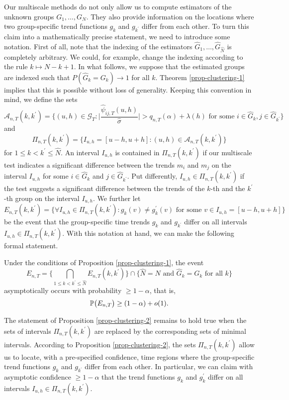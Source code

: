 \documentclass[a4paper,12pt]{article}
\numberwithin{equation}{section}
\begin{document}
Our multiscale methods do not only allow us to compute estimators of the unknown groups $G_1,\ldots,G_N$. They also provide information on the locations where two group-specific trend functions $g_k$ and $g_{k^\prime}$ differ from each other. To turn this claim into a mathematically precise statement, we need to introduce some notation. First of all, note that the indexing of the estimators $\widehat{G}_1,\ldots,\widehat{G}_{\widehat{N}}$ is completely arbitrary. We could, for example, change the indexing according to the rule $k \mapsto N - k + 1$. In what follows, we suppose that the estimated groups are indexed such that $P( \widehat{G}_k = G_k) \rightarrow 1$ for all $k$. Theorem \ref{prop-clustering-1} implies that this is possible without loss of generality. Keeping this convention in mind, we define the sets 
\[ \mathcal{A}_{n,T}(k,k^\prime) = \Big\{ (u,h) \in \mathcal{G}_T: \Big| \frac{\widehat{\psi}_{ij,T}(u,h)}{\widehat{\sigma}} \Big| > q_{n,T}(\alpha) + \lambda(h) \text{ for some } i \in \widehat{G}_k, j \in \widehat{G}_{k^\prime} \Big\} \] 
and  
\[ \Pi_{n,T}(k,k^\prime) = \big\{ I_{u,h} = [u-h,u+h]: (u,h) \in \mathcal{A}_{n,T}(k,k^\prime) \big\} \]
for $1 \le k < k^\prime \le \widehat{N}$. An interval $I_{u,h}$ is contained in $\Pi_{n,T}(k,k^\prime)$ if our multiscale test indicates a significant difference between the trends $m_i$ and $m_j$ on the interval $I_{u,h}$ for some $i \in \widehat{G}_k$ and $j \in \widehat{G}_{k^\prime}$. Put differently,  $I_{u,h} \in \Pi_{n,T}(k,k^\prime)$ if the test suggests a significant difference between the trends of the $k$-th and the $k^\prime$-th group on the interval $I_{u,h}$. We further let
\[ E_{n,T}(k,k^\prime) = \Big\{ \forall I_{u,h} \in \Pi_{n,T}(k,k^\prime): g_k(v) \ne g_k^\prime(v) \text{ for some } v \in I_{u,h} = [u-h,u+h] \Big\} \]
be the event that the group-specific time trends $g_k$ and $g_{k^\prime}$ differ on all intervals $I_{u,h} \in \Pi_{n,T}(k,k^\prime)$. With this notation at hand, we can make the following formal statement.
\begin{prop}\label{prop-clustering-2}
Under the conditions of Proposition \ref{prop-clustering-1}, the event 
\[ E_{n,T} = \Big\{ \bigcap_{1 \le k < k^\prime \le \widehat{N}} E_{n,T}(k,k^\prime) \Big\} \cap \Big\{ \widehat{N} = N \text{ and } \widehat{G}_k = G_k \text{ for all } k \Big\} \]
asymptotically occurs with probability $\ge 1-\alpha$, that is, 
\[ \mathbb{P} \big( E_{n,T} \big) \ge (1 - \alpha) + o(1). \]
\end{prop}
The statement of Proposition \ref{prop-clustering-2} remains to hold true when the sets of intervals $\Pi_{n,T}(k,k^\prime)$ are replaced by the corresponding sets of minimal intervals. According to Proposition \ref{prop-clustering-2}, the sets $\Pi_{n,T}(k,k^\prime)$ allow us to locate, with a pre-specified confidence, time regions where the group-specific trend functions $g_k$ and $g_{k^\prime}$ differ from each other. In particular, we can claim with asymptotic confidence $\ge 1 - \alpha$ that the trend functions $g_k$ and $g_k^\prime$ differ on all intervals $I_{u,h} \in \Pi_{n,T}(k,k^\prime)$. 
\end{document}
